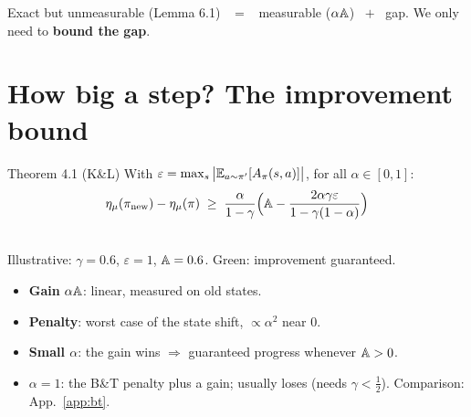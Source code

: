\begin{keybox}
Exact but unmeasurable (Lemma 6.1) \ $=$ \ measurable ($\alpha\mathbb{A}$) \ $+$ \ gap. We only need to \textbf{bound the gap}.
\end{keybox}

\section{How big a step? The improvement bound}

\begin{thmbox}{Theorem 4.1 (K\&L)}
With $\varepsilon = \max_s \big|\mathbb{E}_{a\sim\pi'}[A_\pi(s,a)]\big|$, for all $\alpha\in[0,1]$:
\begin{gather*}
  \eta_\mu(\pi_{\mathrm{new}}) - \eta_\mu(\pi) \;\ge\; \frac{\alpha}{1-\gamma}\Big(\mathbb{A} - \frac{2\alpha\gamma\varepsilon}{1-\gamma(1-\alpha)}\Big)
\end{gather*}
\end{thmbox}

\begin{minipage}[c]{0.5\linewidth}
\centering
{}\\
{\scriptsize Illustrative: $\gamma=0.6$, $\varepsilon=1$, $\mathbb{A}=0.6$. Green: improvement guaranteed.}
\end{minipage}\hfill
\begin{minipage}[c]{0.47\linewidth}
\begin{itemize}
  \item \textbf{Gain} $\alpha\mathbb{A}$: linear, measured on old states.
  \item \textbf{Penalty}: worst case of the state shift, $\propto\alpha^2$ near 0.
  \item \textbf{Small $\alpha$}: the gain wins $\Rightarrow$ guaranteed progress whenever $\mathbb{A}>0$.
  \item \textbf{$\alpha=1$}: the B\&T penalty plus a gain; usually loses (needs $\gamma<\frac12$). Comparison: App.~\ref{app:bt}.
\end{itemize}
\end{minipage}


